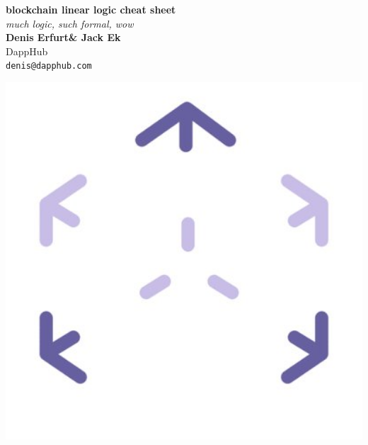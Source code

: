 \documentclass[a0,portrait]{a0poster}
\begin{document}


\begin{minipage}[b]{0.75\linewidth}
\veryHuge \color{NavyBlue} \textbf{blockchain linear logic cheat sheet} \color{Black}\\ %
\Huge\textit{much logic, such formal, wow}\\[2cm] %
\huge \textbf{Denis Erfurt\& Jack Ek}\\[0.5cm] %
\huge DappHub\\[0.4cm] %
\Large \texttt{denis@dapphub.com}\\

\end{minipage}
%
\begin{minipage}[b]{0.25\linewidth}
\includegraphics[width=20cm]{logo.jpg}\\
\end{minipage}
\end{document}
